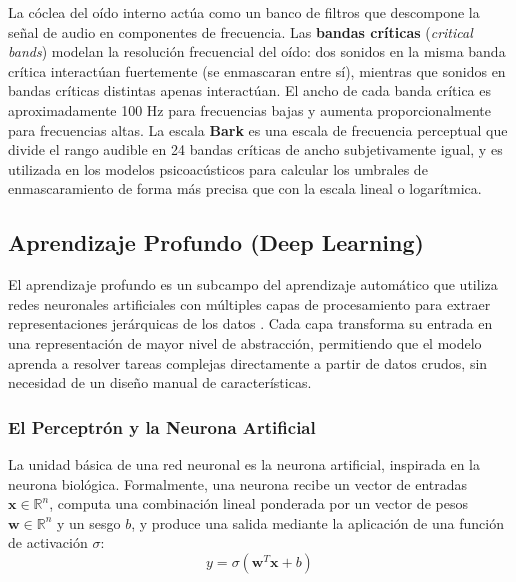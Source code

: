 La cóclea del oído interno actúa como un banco de filtros que descompone la señal de audio en componentes de frecuencia. Las \textbf{bandas críticas} (\textit{critical bands}) modelan la resolución frecuencial del oído: dos sonidos en la misma banda crítica interactúan fuertemente (se enmascaran entre sí), mientras que sonidos en bandas críticas distintas apenas interactúan. El ancho de cada banda crítica es aproximadamente 100 Hz para frecuencias bajas y aumenta proporcionalmente para frecuencias altas. La escala \textbf{Bark} es una escala de frecuencia perceptual que divide el rango audible en 24 bandas críticas de ancho subjetivamente igual, y es utilizada en los modelos psicoacústicos para calcular los umbrales de enmascaramiento de forma más precisa que con la escala lineal o logarítmica.

\subsection{Aprendizaje Profundo (Deep Learning)}
\label{sec:deep_learning_theory}

El aprendizaje profundo es un subcampo del aprendizaje automático que utiliza redes neuronales artificiales con múltiples capas de procesamiento para extraer representaciones jerárquicas de los datos \cite{goodfellow2016deep}. Cada capa transforma su entrada en una representación de mayor nivel de abstracción, permitiendo que el modelo aprenda a resolver tareas complejas directamente a partir de datos crudos, sin necesidad de un diseño manual de características.

\subsubsection{El Perceptrón y la Neurona Artificial}

La unidad básica de una red neuronal es la neurona artificial, inspirada en la neurona biológica. Formalmente, una neurona recibe un vector de entradas $\mathbf{x} \in \mathbb{R}^n$, computa una combinación lineal ponderada por un vector de pesos $\mathbf{w} \in \mathbb{R}^n$ y un sesgo $b$, y produce una salida mediante la aplicación de una función de activación $\sigma$:
\begin{equation}
    y = \sigma(\mathbf{w}^T \mathbf{x} + b)
\end{equation}

